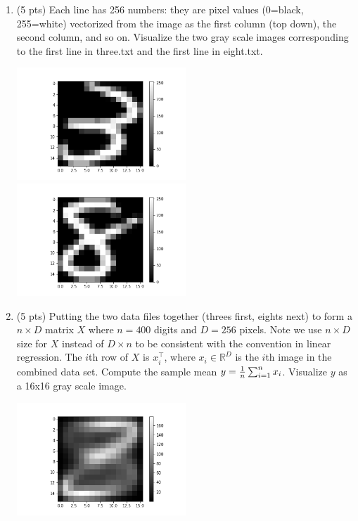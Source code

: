 \documentclass[a4paper]{article}
\theoremstyle{definition}
\def\R{\mathbb R}
\newenvironment{soln}{
    \leavevmode\color{blue}\ignorespaces
}{}
\begin{document}
\begin{enumerate}
\item (5 pts) Each line has 256 numbers: they are pixel values (0=black, 255=white) vectorized from the image as the first column (top down), the second column, and so on.
Visualize the two gray scale images corresponding to the first line in three.txt and the first line in eight.txt.

\begin{soln}
\includegraphics[width=0.5\textwidth]{three.png}
\includegraphics[width=0.5\textwidth]{eight.png}
\end{soln}

\item (5 pts) Putting the two data files together (threes first, eights next) to form a $n \times D$ matrix $X$ where $n=400$ digits and $D=256$ pixels.  Note we use $n\times D$ size for $X$ instead of $D\times n$ to be consistent with the convention in linear regression.   The $i$th row of $X$ is $x_i^\top$, where $x_i \in \R^D$ is the $i$th image in the combined data set.
Compute the sample mean $y = {1\over n} \sum_{i=1}^n x_i$.
Visualize $y$ as a 16x16 gray scale image.

\begin{soln}
\begin{center}
\includegraphics[width=0.5\textwidth]{q42.png}
\end{center}
\end{soln}


\end{enumerate}
\end{document}
